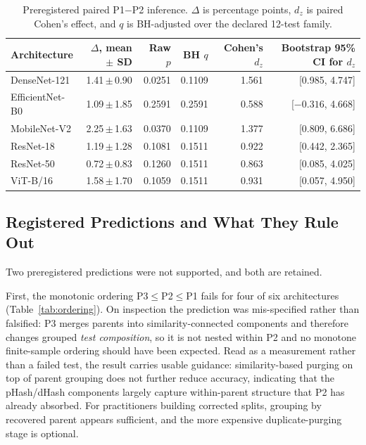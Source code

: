\documentclass[conference]{IEEEtran}
\newcommand{\meanpm}[2]{#1\,$\pm$\,#2}
\newcommand{\protocol}[1]{\textsf{#1}}
\begin{document}
\begin{table}[t]
\caption{Preregistered paired \protocol{P1}$-$\protocol{P2} inference. $\Delta$ is percentage points, $d_z$ is paired Cohen's effect, and $q$ is BH-adjusted over the declared 12-test family.}
\label{tab:inference}
\centering
\scriptsize
\setlength{\tabcolsep}{7.0pt}
\begin{tabular}{lrrrrr}
\toprule
Architecture & $\Delta$, mean $\pm$ SD & Raw $p$ & BH $q$ & Cohen's $d_z$ & Bootstrap 95\% CI for $d_z$ \\
\midrule
DenseNet-121 & \meanpm{1.41}{0.90} & 0.0251 & 0.1109 & 1.561 & [0.985, 4.747] \\
EfficientNet-B0 & \meanpm{1.09}{1.85} & 0.2591 & 0.2591 & 0.588 & [$-0.316$, 4.668] \\
MobileNet-V2 & \meanpm{2.25}{1.63} & 0.0370 & 0.1109 & 1.377 & [0.809, 6.686] \\
ResNet-18 & \meanpm{1.19}{1.28} & 0.1081 & 0.1511 & 0.922 & [0.442, 2.365] \\
ResNet-50 & \meanpm{0.72}{0.83} & 0.1260 & 0.1511 & 0.863 & [0.085, 4.025] \\
ViT-B/16 & \meanpm{1.58}{1.70} & 0.1059 & 0.1511 & 0.931 & [0.057, 4.950] \\
\bottomrule
\end{tabular}
\end{table}

\subsection{Registered Predictions and What They Rule Out}
Two preregistered predictions were not supported, and both are retained.

First, the monotonic ordering \protocol{P3}$\leq$\protocol{P2}$\leq$\protocol{P1} fails for four of six architectures (Table~\ref{tab:ordering}).
On inspection the prediction was mis-specified rather than falsified: \protocol{P3} merges parents into similarity-connected components and therefore changes grouped \emph{test composition}, so it is not nested within \protocol{P2} and no monotone finite-sample ordering should have been expected.
Read as a measurement rather than a failed test, the result carries usable guidance: similarity-based purging on top of parent grouping does not further reduce accuracy, indicating that the pHash/dHash components largely capture within-parent structure that \protocol{P2} has already absorbed.
For practitioners building corrected splits, grouping by recovered parent appears sufficient, and the more expensive duplicate-purging stage is optional.
\end{document}
